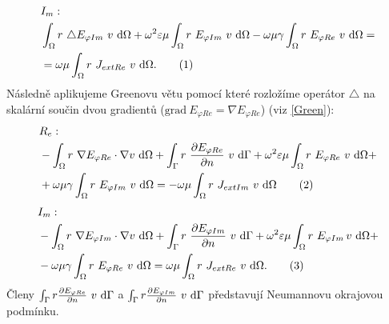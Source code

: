 \documentclass[12pt,a4paper,oneside]{article}
\numberwithin{equation}{section} %
\numberwithin{figure}{section} %
\numberwithin{table}{section} %
\newcommand{\grad}{\mathrm{grad}\ }
\newcommand\numberthis{\addtocounter{equation}{1}\tag{\theequation}}
\begin{document}
\begin{align*}
&I_m:
\\
&\int _{\Omega} r ~ \triangle E _{\varphi Im} ~ v ~ \ud \Omega + \omega ^2 \varepsilon \mu \int _{\Omega} r ~ E _{\varphi Im} ~ v ~ \ud \Omega - \omega \mu \gamma \int _{\Omega} r ~ E _{\varphi Re} ~ v ~ \ud \Omega =\\ 
&= \omega \mu \int _{\Omega} r ~ J _{extRe} ~ v ~ \ud \Omega .
\numberthis
\end{align*}
Následně aplikujeme Greenovu větu pomocí které rozložíme operátor $\triangle$ na skalární součin dvou gradientů ($\grad E _{\varphi Re} = \nabla E _{\varphi Re}$) (viz \ref{Green}):
\begin{align*}
&R_e:
\\
&- \int _{\Omega} r ~ \nabla E _{\varphi Re} \cdot \nabla v ~ \ud \Omega + \int _{\Gamma} r ~ \frac{\partial E _{\varphi Re}}{\partial n} ~ v ~ \ud \Gamma + \omega ^2 \varepsilon \mu \int _{\Omega} r ~ E _{\varphi Re} ~ v ~ \ud \Omega +\\
& + \omega \mu \gamma \int _{\Omega} r ~ E _{\varphi Im} ~ v ~ \ud \Omega = - \omega \mu \int _{\Omega} r ~ J _{extIm} ~ v ~ \ud \Omega
\numberthis
\end{align*}
\begin{align*}
&I_m:
\\
&- \int _{\Omega} r ~ \nabla E _{\varphi Im} \cdot \nabla v ~ \ud \Omega + \int _{\Gamma} r ~ \frac{\partial E _{\varphi Im}}{\partial n} ~ v ~ \ud \Gamma + \omega ^2 \varepsilon \mu \int _{\Omega} r ~ E _{\varphi Im} \! ~ v ~ \ud \Omega +\\ 
& - \omega \mu \gamma \int _{\Omega} r ~ E _{\varphi Re} ~ v ~ \ud \Omega = \omega \mu \int _{\Omega} r ~ J _{extRe} ~ v ~ \ud \Omega .
\numberthis
\end{align*}
Členy $\int _{\Gamma} r \frac{\partial E _{\varphi Re}}{\partial n} ~ v ~ \mathrm{d} \Gamma$ a $\int _{\Gamma} r \frac{\partial E _{\varphi Im}}{\partial n} ~ v ~ \mathrm{d} \Gamma$ představují Neumannovu okrajovou podmínku.
\end{document}
